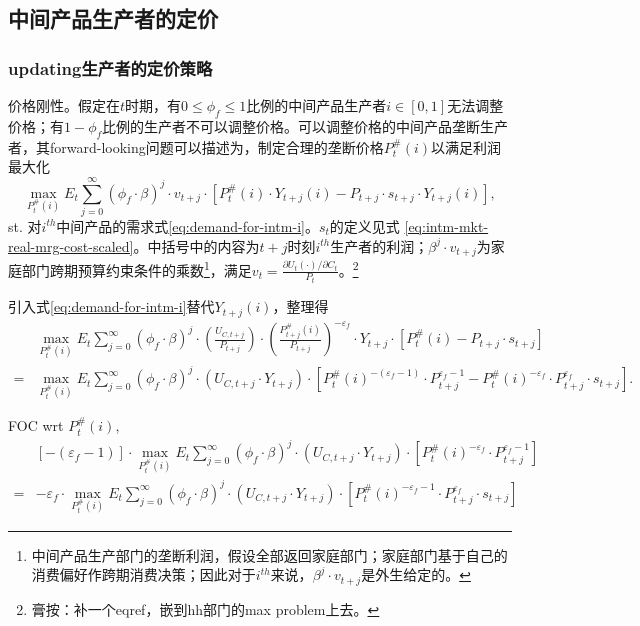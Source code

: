 \subsection{中间产品生产者的定价}
\label{sec:intm-pricing-calvo}

\subsubsection{updating生产者的定价策略}
\label{seq:intm-updating-pricing}

价格刚性。假定在$t$时期，有$0 \le \phi_f \le 1$比例的中间产品生产者$i \in [0,1]$无法调整价格；有$1-\phi_f$比例的生产者不可以调整价格。可以调整价格的中间产品垄断生产者，其forward-looking问题可以描述为，制定合理的垄断价格$P_t^{\#}(i)$以满足利润最大化
\begin{equation}
  \label{eq:intm-pricing-problem-1}
  \max_{P_{t}^{\#}(i)} E_t \sum_{j=0}^{\infty}\left( \phi_f \cdot \beta \right)^j \cdot v_{t+j} \cdot \left[P_{t}^{\#}(i) \cdot Y_{t+j}(i) - P_{t+j} \cdot s_{t+j} \cdot Y_{t+j}(i)\right],
\end{equation}
st. 对$i^{th}$中间产品的需求式\eqref{eq:demand-for-intm-i}。$s_t$的定义见式  \eqref{eq:intm-mkt-real-mrg-cost-scaled}。中括号中的内容为$t+j$时刻$i^{th}$生产者的利润；$\beta^j \cdot v_{t+j}$为家庭部门跨期预算约束条件的乘数\footnote{中间产品生产部门的垄断利润，假设全部返回家庭部门；家庭部门基于自己的消费偏好作跨期消费决策；因此对于$i^{th}$来说，$\beta^j \cdot v_{t+j}$是外生给定的。}，满足$v_{t}=\frac{\partial U_t(\cdot) / \partial C_t}{P_t}$。\footnote{膏按：补一个eqref，嵌到hh部门的max problem上去。}

引入式\eqref{eq:demand-for-intm-i}替代$Y_{t+j}(i)$，整理得
\begin{align*}
  &\max_{P_{t}^{\#}(i)} E_t \sum_{j=0}^{\infty}\left( \phi_f \cdot \beta \right)^j \cdot
\left(\frac{U_{C,t+j}}{P_{t+j}}\right) \cdot
\left(
  \frac{P_{t+j}^{\#}(i)}{P_{t+j}}
\right)^{-\varepsilon_f} \cdot Y_{t+j} \cdot
\left[P_{t}^{\#}(i)  - P_{t+j} \cdot s_{t+j} \right]\\
=&\max_{P_{t}^{\#}(i)} E_t \sum_{j=0}^{\infty}\left( \phi_f \cdot \beta \right)^j \cdot
\left(
U_{C,t+j} \cdot Y_{t+j}
\right) \cdot
\left[P_{t}^{\#}(i)^{-(\varepsilon_f - 1)}  \cdot P_{t+j}^{\varepsilon_f -1}- P_{t}^{\#}(i)^{-\varepsilon_f} \cdot P_{t+j}^{\varepsilon_f} \cdot s_{t+j} \right].
\end{align*}

FOC wrt $P_{t}^{\#}(i)$,
\begin{align*}
&  \left[-(\varepsilon_f - 1)\right] \cdot
\max_{P_{t}^{\#}(i)} E_t \sum_{j=0}^{\infty}\left( \phi_f \cdot \beta \right)^j \cdot
\left(
U_{C,t+j} \cdot Y_{t+j}
\right) \cdot
\left[
  P_{t}^{\#}(i)^{-\varepsilon_f} \cdot P_{t+j}^{\varepsilon_f - 1}
\right] \\
=& -\varepsilon_f \cdot
\max_{P_{t}^{\#}(i)} E_t \sum_{j=0}^{\infty}\left( \phi_f \cdot \beta \right)^j \cdot
\left(
U_{C,t+j} \cdot Y_{t+j}
\right) \cdot
\left[
  P_{t}^{\#}(i)^{-\varepsilon_f - 1} \cdot P_{t+j}^{\varepsilon_f} \cdot s_{t+j}
\right]
\end{align*}

